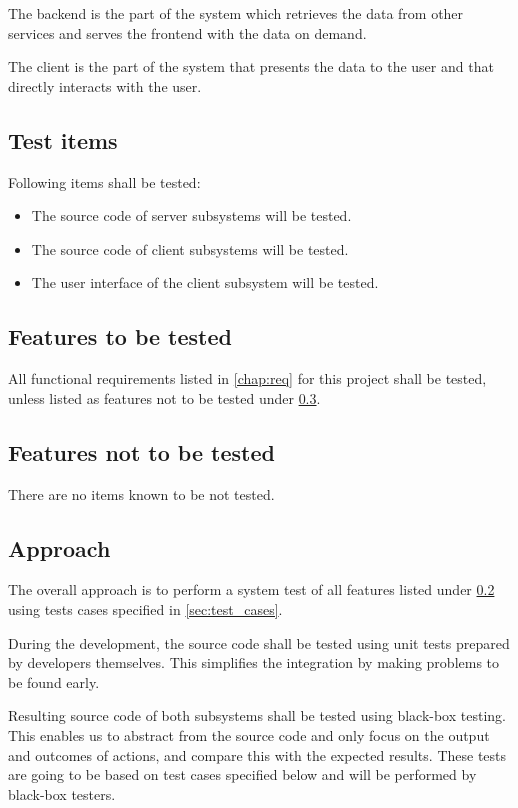 \documentclass[11pt]{book}
\begin{document}
The backend is the part of the system which retrieves the data from other services and serves the frontend with the data on demand.

The client is the part of the system that presents the data to the user and that directly interacts with the user.

\subsection{Test items}
Following items shall be tested:

\begin{itemize}
    \item The source code of server subsystems will be tested.
    \item The source code of client subsystems will be tested.
    \item The user interface of the client subsystem will be tested.
\end{itemize}

\subsection{Features to be tested} \label{sec:test_plan_features_tested}
All functional requirements listed in \ref{chap:req} for this project shall be tested, unless listed as features not to be tested under \ref{sec:test_plan_features_not_tested}.

\subsection{Features not to be tested} \label{sec:test_plan_features_not_tested}
There are no items known to be not tested.

\subsection{Approach}
The overall approach is to perform a system test of all features listed under \ref{sec:test_plan_features_tested} using tests cases specified in \ref{sec:test_cases}.

During the development, the source code shall be tested using unit tests prepared by developers themselves. This simplifies the integration by making problems to be found early.

Resulting source code of both subsystems shall be tested using black-box testing. This enables us to abstract from the source code and only focus on the output and outcomes of actions, and compare this with the expected results. These tests are going to be based on test cases specified below and will be performed by black-box testers.
\end{document}
